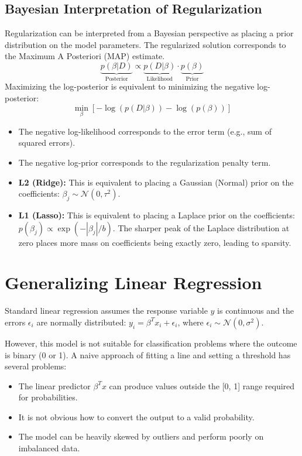 \documentclass{article}
\begin{document}
\begin{multicols}{2}
	\subsection{Bayesian Interpretation of Regularization}
	Regularization can be interpreted from a Bayesian perspective as placing a prior distribution on the model parameters. The regularized solution corresponds to the Maximum A Posteriori (MAP) estimate.
	$$ \underbrace{p(\beta|D)}_{\text{Posterior}} \propto \underbrace{p(D|\beta)}_{\text{Likelihood}} \cdot \underbrace{p(\beta)}_{\text{Prior}} $$
	Maximizing the log-posterior is equivalent to minimizing the negative log-posterior:
	$$ \min_{\beta} [-\log(p(D|\beta)) - \log(p(\beta))] $$
	\begin{itemize}
		\item The negative log-likelihood corresponds to the error term (e.g., sum of squared errors).
		\item The negative log-prior corresponds to the regularization penalty term.
		\item \textbf{L2 (Ridge):} This is equivalent to placing a Gaussian (Normal) prior on the coefficients: $\beta_j \sim \mathcal{N}(0, \tau^2)$.
		\item \textbf{L1 (Lasso):} This is equivalent to placing a Laplace prior on the coefficients: $p(\beta_j) \propto \exp(-|\beta_j|/b)$. The sharper peak of the Laplace distribution at zero places more mass on coefficients being exactly zero, leading to sparsity.
	\end{itemize}

	\section{Generalizing Linear Regression}
	Standard linear regression assumes the response variable $y$ is continuous and the errors $\epsilon_i$ are normally distributed: $y_i = \beta^T x_i + \epsilon_i$, where $\epsilon_i \sim \mathcal{N}(0, \sigma^2)$.

	However, this model is not suitable for classification problems where the outcome is binary (0 or 1). A naive approach of fitting a line and setting a threshold has several problems:
	\begin{itemize}
		\item The linear predictor $\beta^T x$ can produce values outside the [0, 1] range required for probabilities.
		\item It is not obvious how to convert the output to a valid probability.
		\item The model can be heavily skewed by outliers and perform poorly on imbalanced data.
	\end{itemize}


\end{multicols}
\end{document}
